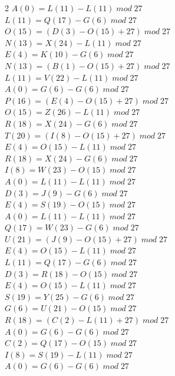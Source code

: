 \documentclass{article}
\begin{document}
\begin{enumerate}
\begin{multicols}{2}
$A (0) = L (11) - L (11) \;  mod \; 27$\\
$L (11) = Q (17) - G (6) \;  mod \; 27$\\
$O (15) = (D (3) - O (15) + 27) \;  mod \; 27$\\
$N (13) = X (24) - L (11) \;  mod \; 27$\\
$E (4) = K (10) - G (6) \;  mod \; 27$\\
$N (13) = (B (1) - O (15) + 27) \;  mod \; 27$\\
$L (11) = V (22) - L (11) \;  mod \; 27$\\
$A (0) = G (6) - G (6) \;  mod \; 27$\\
$P (16) = (E (4) - O (15) + 27) \;  mod \; 27$\\
$O (15) = Z (26) - L (11) \;  mod \; 27$\\
$R (18) = X (24) - G (6) \;  mod \; 27$\\
$T (20) = (I (8) - O (15) + 27) \;  mod \; 27$\\
$E (4) = O (15) - L (11) \;  mod \; 27$\\
$R (18) = X (24) - G (6) \;  mod \; 27$\\
$I (8) = W (23) - O (15) \;  mod \; 27$\\
$A (0) = L (11) - L (11) \;  mod \; 27$\\
$D (3) = J (9) - G (6) \;  mod \; 27$\\
$E (4) = S (19) - O (15) \;  mod \; 27$\\
$A (0) = L (11) - L (11) \;  mod \; 27$\\
$Q (17) = W (23) - G (6) \;  mod \; 27$\\
$U (21) = (J (9) - O (15) +27) \;  mod \; 27$\\
$E (4) = O (15) - L (11) \;  mod \; 27$\\
$L (11) = Q (17) - G (6) \;  mod \; 27$\\
$D (3) = R (18) - O (15) \;  mod \; 27$\\
$E (4) = O (15) - L (11) \;  mod \; 27$\\
$S (19) = Y (25) - G (6) \;  mod \; 27$\\
$G (6) = U (21) - O (15) \;  mod \; 27$\\
$R (18) = (C (2) - L (11) +27) \;  mod \; 27$\\
$A (0) = G (6) - G (6) \;  mod \; 27$\\
$C (2) = Q (17) - O (15) \;  mod \; 27$\\
$I (8) = S (19) - L (11) \;  mod \; 27$\\
$A (0) = G (6) - G (6) \;  mod \; 27$\\

\end{multicols}
\end{enumerate}
\end{document}
